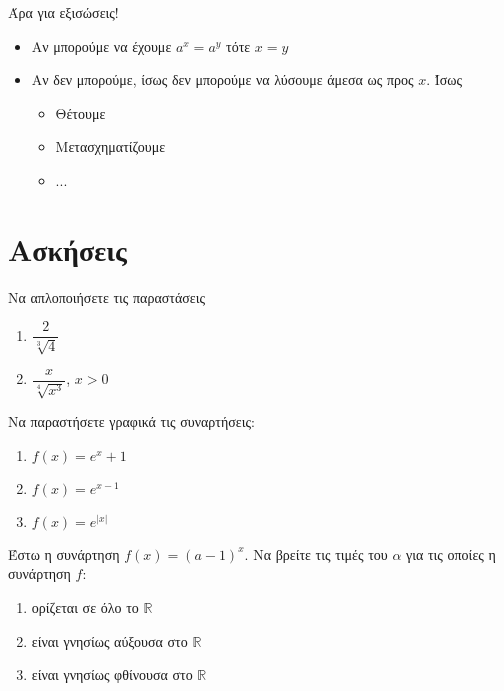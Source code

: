 \documentclass{../presentation}
\begin{document}
\begin{frame}{Άρα για εξισώσεις!}
  \begin{itemize}
    \item<1-> Αν μπορούμε να έχουμε $a^x=a^y$ τότε $x=y$
    \item<2-> Αν δεν μπορούμε, ίσως δεν μπορούμε να λύσουμε άμεσα ως προς $x$. Ίσως
          \begin{itemize}
            \item<3-> Θέτουμε
            \item<4-> Μετασχηματίζουμε
            \item<4-> ...
          \end{itemize}
  \end{itemize}
\end{frame}

\section{Ασκήσεις}
\begin{askisi}
  Να απλοποιήσετε τις παραστάσεις
  \begin{enumerate}
    \item<1-> $\dfrac{2}{\sqrt[3]{4}}$
    \item<2-> $\dfrac{x}{\sqrt[4]{x^3}}$, $x>0$
  \end{enumerate}


\end{askisi}

\begin{askisi}
  Να παραστήσετε γραφικά τις συναρτήσεις:
  \begin{enumerate}
    \item<1-> $f(x)=e^x+1$
    \item<2-> $f(x)=e^{x-1}$
    \item<3-> $f(x)=e^{|x|}$
  \end{enumerate}


\end{askisi}

\begin{askisi}
  Έστω η συνάρτηση $f(x)=(a-1)^x$. Να βρείτε τις τιμές του $α$ για τις οποίες η συνάρτηση $f$:
  \begin{enumerate}
    \item<1-> ορίζεται σε όλο το $\mathbb{R}$
    \item<2-> είναι γνησίως αύξουσα στο $\mathbb{R}$
    \item<3-> είναι γνησίως φθίνουσα στο $\mathbb{R}$
  \end{enumerate}


\end{askisi}
\end{document}
